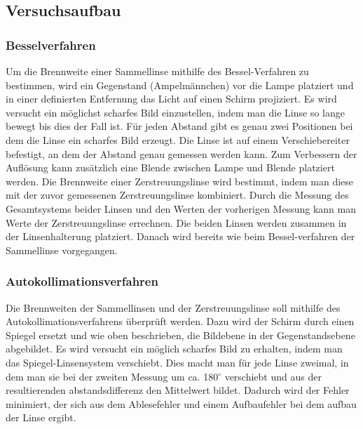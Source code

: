 \documentclass[a4paper, 12pt]{article}
\begin{document}
\subsection{Versuchsaufbau}
\subsubsection{Besselverfahren}
	Um die Brennweite einer Sammellinse mithilfe des Bessel-Verfahren zu bestimmen, wird ein Gegenstand (Ampelmännchen) vor die Lampe platziert und in einer definierten Entfernung das Licht auf einen Schirm projiziert. Es wird versucht ein möglichst scharfes Bild einzustellen, indem man die Linse so lange bewegt bis dies der Fall ist. Für jeden Abstand gibt es genau zwei Positionen bei dem die Linse ein scharfes Bild erzeugt. Die Linse ist auf einem Verschiebereiter befestigt, an dem der Abstand genau gemessen werden kann. Zum Verbessern der Auflösung kann zusätzlich eine Blende zwischen Lampe und Blende platziert werden. Die Brennweite einer Zerstreuungslinse wird bestimmt, indem man diese mit der zuvor gemessenen Zerstreuungslinse kombiniert. Durch die Messung des Gesamtsystems beider Linsen und den Werten der vorherigen Messung kann man Werte der Zerstreuungslinse errechnen. Die beiden Linsen werden zusammen in der Linsenhalterung platziert. Danach wird bereits wie beim Bessel-verfahren der Sammellinse vorgegangen.

\subsubsection{Autokollimationsverfahren}
	Die Brennweiten der Sammellinsen und der Zerstreuungslinse soll mithilfe des Autokollimationsverfahrens überprüft werden. Dazu wird der Schirm durch einen Spiegel ersetzt und wie oben beschrieben, die Bildebene in der Gegenstandsebene abgebildet. Es wird versucht ein möglich scharfes Bild zu erhalten, indem man das Spiegel-Linsensystem verschiebt. Dies macht man für jede Linse zweimal, in dem man sie bei der zweiten Messung um ca. 180$^\circ$ verschiebt und aus der resultierenden abstandsdifferenz den Mittelwert bildet. Dadurch wird der Fehler minimiert, der sich aus dem Ablesefehler und einem Aufbaufehler bei dem aufbau der Linse ergibt.
\end{document}
